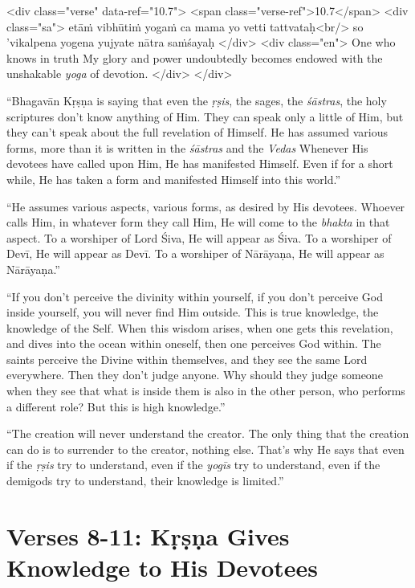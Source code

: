 \begin{html}
<div class="verse" data-ref="10.7">
  <span class="verse-ref">10.7</span>
  <div class="sa">
    etāṁ vibhūtiṁ yogaṁ ca mama yo vetti tattvataḥ<br/>
    so ’vikalpena yogena yujyate nātra saṁśayaḥ
  </div>
  <div class="en">
    One who knows in truth My glory and power undoubtedly becomes endowed with the unshakable \textit{yoga} of devotion.
  </div>
</div>
\end{html}


\enquote{Bhagavān Kṛṣṇa is saying that even the \textit{ṛṣis}, the sages, the \textit{śāstras}, the holy scriptures don’t know anything of Him. They can speak only a little of Him, but they can’t speak about the full revelation of Himself. He has assumed various forms, more than it is written in the \textit{śāstras} and the \textit{Vedas} Whenever His devotees have called upon Him, He has manifested Himself. Even if for a short while, He has taken a form and manifested Himself into this world.}

\enquote{He assumes various aspects, various forms, as desired by His devotees. Whoever calls Him, in whatever form they call Him, He will come to the \textit{bhakta} in that aspect. To a worshiper of Lord Śiva, He will appear as Śiva. To a worshiper of Devī, He will appear as Devī. To a worshiper of Nārāyaṇa, He will appear as Nārāyaṇa.}

\enquote{If you don’t perceive the divinity within yourself, if you don’t perceive God inside yourself, you will never find Him outside. This is true knowledge, the knowledge of the Self. When this wisdom arises, when one gets this revelation, and dives into the ocean within oneself, then one perceives God within. The saints perceive the Divine within themselves, and they see the same Lord everywhere. Then they don’t judge anyone. Why should they judge someone when they see that what is inside them is also in the other person, who performs a different role? But this is high knowledge.}

\enquote{The creation will never understand the creator. The only thing that the creation can do is to surrender to the creator, nothing else. That’s why He says that even if the \textit{ṛṣis} try to understand, even if the \textit{yogīs} try to understand, even if the demigods try to understand, their knowledge is limited.}

\newpage
\section{Verses 8-11: Kṛṣṇa Gives Knowledge to His Devotees}\label{sec-verses-8-11-krsna-gives-knowledge-to-his-devotees}


